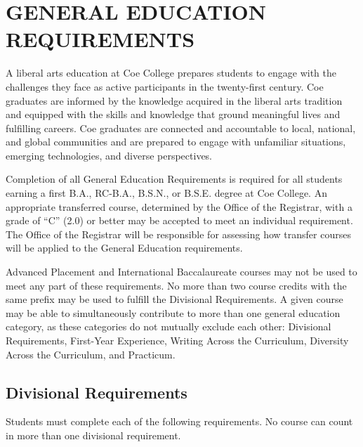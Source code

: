 \documentclass[
  letterpaper,
]{scrbook}
\begin{document}
\section{GENERAL EDUCATION
REQUIREMENTS}\label{general-education-requirements}

A liberal arts education at Coe College prepares students to engage with
the challenges they face as active participants in the twenty-first
century. Coe graduates are informed by the knowledge acquired in the
liberal arts tradition and equipped with the skills and knowledge that
ground meaningful lives and fulfilling careers. Coe graduates are
connected and accountable to local, national, and global communities and
are prepared to engage with unfamiliar situations, emerging
technologies, and diverse perspectives.

Completion of all General Education Requirements is required for all
students earning a first B.A., RC-B.A., B.S.N., or B.S.E. degree at Coe
College. An appropriate transferred course, determined by the Office of
the Registrar, with a grade of ``C'' (2.0) or better may be accepted to
meet an individual requirement. The Office of the Registrar will be
responsible for assessing how transfer courses will be applied to the
General Education requirements.

Advanced Placement and International Baccalaureate courses may not be
used to meet any part of these requirements. No more than two course
credits with the same prefix may be used to fulfill the Divisional
Requirements. A given course may be able to simultaneously contribute to
more than one general education category, as these categories do not
mutually exclude each other: Divisional Requirements, First-Year
Experience, Writing Across the Curriculum, Diversity Across the
Curriculum, and Practicum.

\subsection{Divisional Requirements}\label{divisional-requirements}

Students must complete each of the following requirements. No course can
count in more than one divisional requirement.
\end{document}

